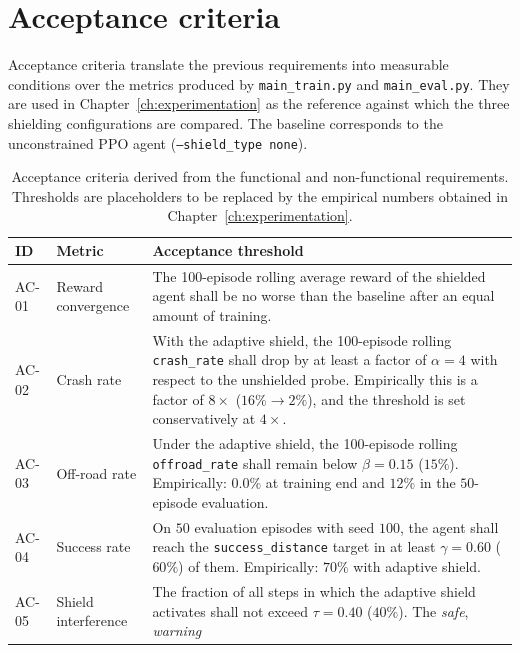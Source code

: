\section{Acceptance criteria}\label{sec:req-acceptance}

Acceptance criteria translate the previous requirements into measurable conditions over the
metrics produced by \texttt{main\_train.py} and \texttt{main\_eval.py}. They are used in
Chapter~\ref{ch:experimentation} as the reference against which the three shielding
configurations are compared. The baseline corresponds to the unconstrained PPO agent
(\texttt{--shield\_type none}).

\begin{table}[H]
  \centering
  \caption{Acceptance criteria derived from the functional and non-functional requirements.
           Thresholds are placeholders to be replaced by the empirical numbers obtained in
           Chapter~\ref{ch:experimentation}.}
  \label{tab:acceptance-criteria}
  \small
  \begin{tabular}{@{}llp{7.5cm}@{}}
    \toprule
    \textbf{ID} & \textbf{Metric} & \textbf{Acceptance threshold} \\
    \midrule
    AC-01 & Reward convergence     & The 100-episode rolling average reward of the shielded
        agent shall be no worse than the baseline after an equal amount of training. \\
    AC-02 & Crash rate             & With the adaptive shield, the 100-episode rolling
        \texttt{crash\_rate} shall drop by at least a factor of \(\alpha=4\) with respect to the
        unshielded probe. Empirically this is a factor of \(8\times\) (\(16\%\to 2\%\)), and the threshold is set conservatively at \(4\times\). \\
    AC-03 & Off-road rate          & Under the adaptive shield, the 100-episode rolling
        \texttt{offroad\_rate} shall remain below \(\beta=0.15\) (\(15\%\)).
        Empirically: \(0.0\%\) at training end and \(12\%\) in the \(50\)-episode evaluation. \\
    AC-04 & Success rate           & On \(50\) evaluation episodes with seed \(100\), the agent
        shall reach the \texttt{success\_distance} target in at least \(\gamma=0.60\)
        (\(60\%\)) of them. Empirically: \(70\%\) with adaptive shield. \\
    AC-05 & Shield interference    & The fraction of all steps in which the adaptive shield
        activates shall not exceed \(\tau=0.40\) (\(40\%\)). The \emph{safe}, \emph{warning}

\end{tabular}
\end{table}

